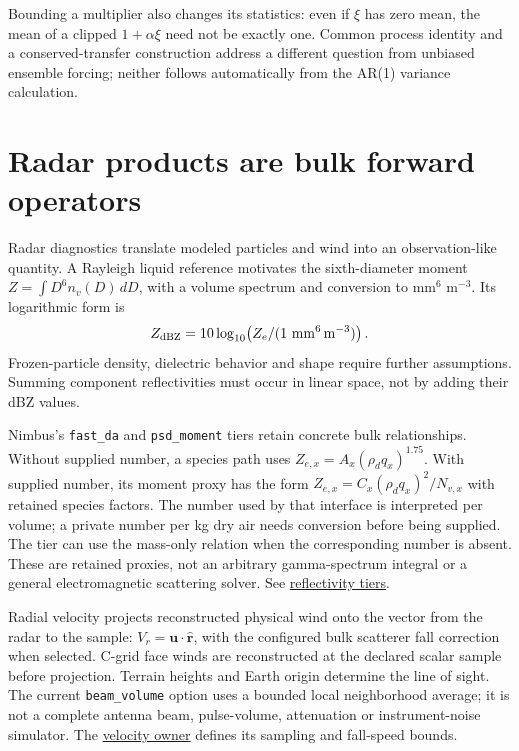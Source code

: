 Bounding a multiplier also changes its statistics: even if $\xi$ has zero mean,
the mean of a clipped $1+\alpha\xi$ need not be exactly one. Common process
identity and a conserved-transfer construction address a different question
from unbiased ensemble forcing; neither follows automatically from the AR(1)
variance calculation.

\section{Radar products are bulk forward operators}
\label{radar-diagnostics-theory}

Radar diagnostics translate modeled particles and wind into an observation-like
quantity. A Rayleigh liquid reference motivates the sixth-diameter moment
$Z=\int D^6n_v(D)\,dD$, with a volume spectrum and conversion to
mm$^6$ m$^{-3}$. Its logarithmic form is
\[
 Z_{\rm dBZ}=10\log_{10}\!\left(
       Z_e/(1\ \mathrm{mm^6\,m^{-3}})\right).
\]
Frozen-particle density, dielectric behavior and shape require further
assumptions. Summing component reflectivities must occur in linear space,
not by adding their dBZ values.

Nimbus's \texttt{fast\_da} and \texttt{psd\_moment} tiers retain concrete
bulk relationships. Without supplied number, a species path uses
$Z_{e,x}=A_x(\rho_dq_x)^{1.75}$. With supplied number, its moment proxy has
the form $Z_{e,x}=C_x(\rho_dq_x)^2/N_{v,x}$ with retained species factors.
The number used by that interface is interpreted per volume; a private number
per kg dry air needs conversion before being supplied. The tier can use the
mass-only relation when the corresponding number is absent. These are retained
proxies, not an arbitrary gamma-spectrum integral or a general electromagnetic
scattering solver. See
\href{../src/radar/schemes/reflectivity/reflectivity.cpp}{reflectivity tiers}.

Radial velocity projects reconstructed physical wind onto the vector from the
radar to the sample:
$V_r=\boldsymbol u\cdot\widehat{\boldsymbol r}$, with the configured bulk
scatterer fall correction when selected. C-grid face winds are reconstructed
at the declared scalar sample before projection. Terrain heights and Earth
origin determine the line of sight. The current \texttt{beam\_volume} option
uses a bounded local neighborhood average; it is not a complete antenna beam,
pulse-volume, attenuation or instrument-noise simulator. The
\href{../src/radar/schemes/velocity/velocity.cpp}{velocity owner} defines its
sampling and fall-speed bounds.


